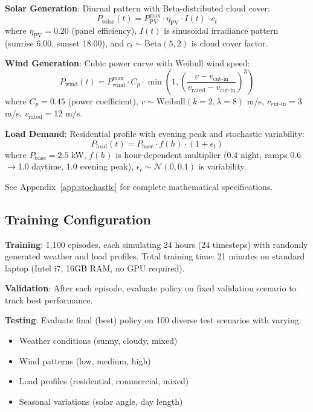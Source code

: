 \documentclass[11pt,a4paper]{article}
\begin{document}
\textbf{Solar Generation}: Diurnal pattern with Beta-distributed cloud cover:
\begin{equation}
P_{\text{solar}}(t) = P_{\text{PV}}^{\max} \cdot \eta_{\text{PV}} \cdot I(t) \cdot c_t
\end{equation}
where $\eta_{\text{PV}} = 0.20$ (panel efficiency), $I(t)$ is sinusoidal irradiance pattern (sunrise 6:00, sunset 18:00), and $c_t \sim \text{Beta}(5, 2)$ is cloud cover factor.

\textbf{Wind Generation}: Cubic power curve with Weibull wind speed:
\begin{equation}
P_{\text{wind}}(t) = P_{\text{wind}}^{\max} \cdot C_p \cdot \min\left(1, \left(\frac{v - v_{\text{cut-in}}}{v_{\text{rated}} - v_{\text{cut-in}}}\right)^3\right)
\end{equation}
where $C_p = 0.45$ (power coefficient), $v \sim \text{Weibull}(k=2, \lambda=8)$ m/s, $v_{\text{cut-in}} = 3$ m/s, $v_{\text{rated}} = 12$ m/s.

\textbf{Load Demand}: Residential profile with evening peak and stochastic variability:
\begin{equation}
P_{\text{load}}(t) = P_{\text{base}} \cdot f(h) \cdot (1 + \epsilon_t)
\end{equation}
where $P_{\text{base}} = 2.5$ kW, $f(h)$ is hour-dependent multiplier (0.4 night, ramps 0.6$\rightarrow$1.0 daytime, 1.0 evening peak), $\epsilon_t \sim \mathcal{N}(0, 0.1)$ is variability.

See Appendix~\ref{app:stochastic} for complete mathematical specifications.

\subsection{Training Configuration}

\textbf{Training}: 1,100 episodes, each simulating 24 hours (24 timesteps) with randomly generated weather and load profiles. Total training time: 21 minutes on standard laptop (Intel i7, 16GB RAM, no GPU required).

\textbf{Validation}: After each episode, evaluate policy on fixed validation scenario to track best performance.

\textbf{Testing}: Evaluate final (best) policy on 100 diverse test scenarios with varying:
\begin{itemize}
    \item Weather conditions (sunny, cloudy, mixed)
    \item Wind patterns (low, medium, high)
    \item Load profiles (residential, commercial, mixed)
    \item Seasonal variations (solar angle, day length)
\end{itemize}
\end{document}
